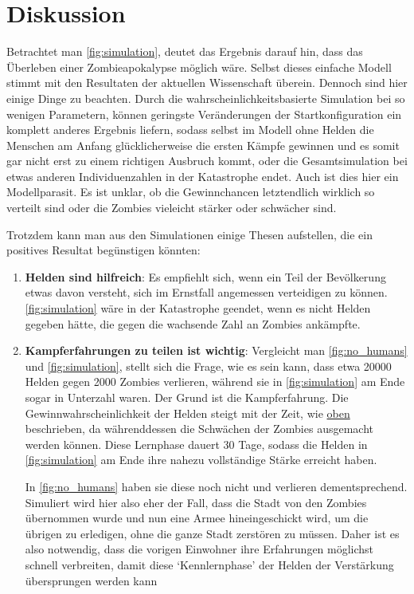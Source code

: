 \section{Diskussion} %
    \label{sec:diskussion}
    Betrachtet man \autoref{fig:simulation}, deutet das Ergebnis darauf hin, dass das Überleben einer Zombieapokalypse möglich wäre. Selbst dieses einfache Modell stimmt mit den Resultaten der aktuellen Wissenschaft überein. Dennoch sind hier einige Dinge zu beachten. Durch die wahrscheinlichkeitsbasierte Simulation bei so wenigen Parametern, können geringste Veränderungen der Startkonfiguration ein komplett anderes Ergebnis liefern, sodass selbst im Modell ohne Helden die Menschen am Anfang glücklicherweise die ersten Kämpfe gewinnen und es somit gar nicht erst zu einem richtigen Ausbruch kommt, oder die Gesamtsimulation bei etwas anderen Individuenzahlen in der Katastrophe endet. Auch ist dies hier ein Modellparasit. Es ist unklar, ob die Gewinnchancen letztendlich wirklich so verteilt sind oder die Zombies vieleicht stärker oder schwächer sind.

    Trotzdem kann man aus den Simulationen einige Thesen aufstellen, die ein positives Resultat begünstigen könnten:
    \begin{enumerate}[1.]
        \item \textbf{Helden sind hilfreich}:
            Es empfiehlt sich, wenn ein Teil der Bevölkerung etwas davon versteht, sich im Ernstfall angemessen verteidigen zu können. \autoref{fig:simulation} wäre in der Katastrophe geendet, wenn es nicht Helden gegeben hätte, die gegen die wachsende Zahl an Zombies ankämpfte.
        \item \textbf{Kampferfahrungen zu teilen ist wichtig}:
            Vergleicht man \autoref{fig:no_humans} und \autoref{fig:simulation}, stellt sich die Frage, wie es sein kann, dass etwa 20000 Helden gegen 2000 Zombies verlieren, während sie in \autoref{fig:simulation} am Ende sogar in Unterzahl waren. Der Grund ist die Kampferfahrung. Die Gewinnwahrscheinlichkeit der Helden steigt mit der Zeit, wie \hyperref[steps:no_humans]{oben} beschrieben, da währenddessen die Schwächen der Zombies ausgemacht werden können. Diese Lernphase dauert 30 Tage, sodass die Helden in \autoref{fig:simulation} am Ende ihre nahezu vollständige Stärke erreicht haben.

            In \autoref{fig:no_humans} haben sie diese noch nicht und verlieren dementsprechend. Simuliert wird hier also eher der Fall, dass die Stadt von den Zombies übernommen wurde und nun eine Armee hineingeschickt wird, um die übrigen zu erledigen, ohne die ganze Stadt zerstören zu müssen. Daher ist es also notwendig, dass die vorigen Einwohner ihre Erfahrungen möglichst schnell verbreiten, damit diese `Kennlernphase' der Helden der Verstärkung übersprungen werden kann
    \end{enumerate}
